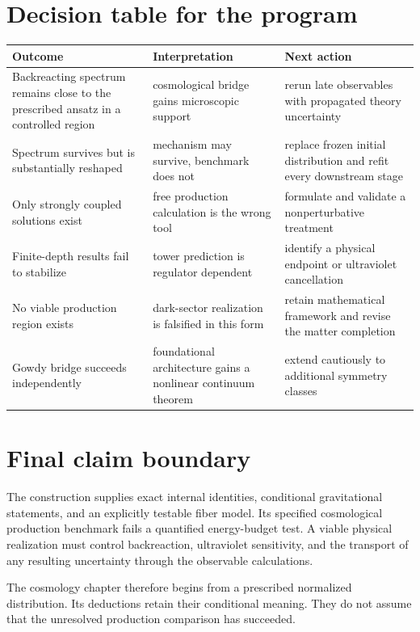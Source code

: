 \section{Decision table for the program}

\begin{longtable}{@{}P{0.27\textwidth}P{0.31\textwidth}P{0.32\textwidth}@{}}
\toprule
Outcome & Interpretation & Next action\\
\midrule
Backreacting spectrum remains close to the prescribed ansatz in a controlled region & cosmological bridge gains microscopic support & rerun late observables with propagated theory uncertainty\\
Spectrum survives but is substantially reshaped & mechanism may survive, benchmark does not & replace frozen initial distribution and refit every downstream stage\\
Only strongly coupled solutions exist & free production calculation is the wrong tool & formulate and validate a nonperturbative treatment\\
Finite-depth results fail to stabilize & tower prediction is regulator dependent & identify a physical endpoint or ultraviolet cancellation\\
No viable production region exists & dark-sector realization is falsified in this form & retain mathematical framework and revise the matter completion\\
Gowdy bridge succeeds independently & foundational architecture gains a nonlinear continuum theorem & extend cautiously to additional symmetry classes\\
\bottomrule
\end{longtable}

\section{Final claim boundary}

The construction supplies exact internal identities, conditional gravitational statements, and an explicitly testable fiber model. Its specified cosmological production benchmark fails a quantified energy-budget test. A viable physical realization must control backreaction, ultraviolet sensitivity, and the transport of any resulting uncertainty through the observable calculations.

The cosmology chapter therefore begins from a prescribed normalized distribution. Its deductions retain their conditional meaning. They do not assume that the unresolved production comparison has succeeded.
